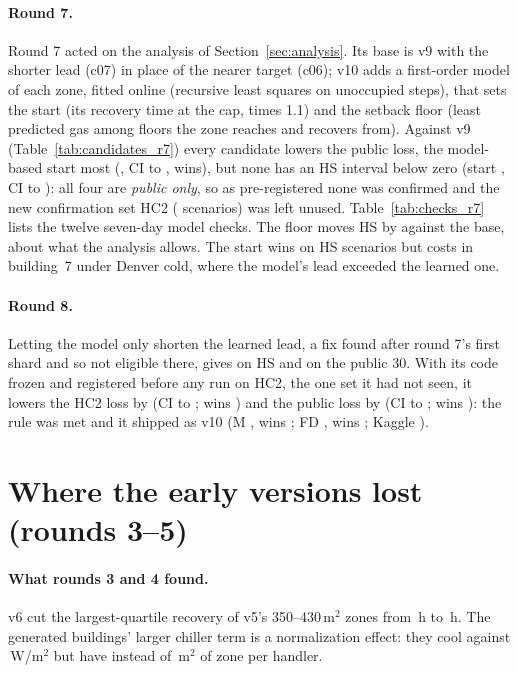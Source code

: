 \documentclass{article}
\begin{document}
\paragraph{Round 7.}
Round 7 acted on the analysis of Section~\ref{sec:analysis}. Its base is v9 with the shorter lead (c07) in place of
the nearer target (c06); v10 adds a first-order model of each zone, fitted online (recursive least squares on unoccupied
steps), that sets the start (its recovery time at the cap, times 1.1) and the setback floor (least predicted gas
among floors the zone reaches and recovers from). Against v9 (Table~\ref{tab:candidates_r7}) every candidate lowers
the public loss, the model-based start most (\RSevScrMbrPubRel, CI \RSevScrMbrPubLo{} to \RSevScrMbrPubHi,
\RSevScrMbrPubWins{} wins), but none has an HS interval below zero (start \RSevScrMbrHsRel, CI \RSevScrMbrHsLo{} to
\RSevScrMbrHsHi): all four are \emph{public only}, so as pre-registered none was confirmed and the new confirmation
set HC2 (\RSevHCTwoN{} scenarios) was left unused. Table~\ref{tab:checks_r7} lists the twelve seven-day model checks. The floor moves HS by \RSevMbfVsBaseHsRel{} against the base,
about what the analysis allows. The start wins on \RSevMbrHsWins{} HS scenarios but costs
\RSevMbrHsWorstRel{} in building~7 under Denver cold, where the model's lead exceeded the learned one.


\paragraph{Round 8.}
Letting the model only shorten the learned lead, a fix found after round 7's first shard and so not eligible there,
gives \RSevLedgerHsRel{} on HS and \RSevLedgerPubRel{} on the public 30. With its code frozen and registered before any
run on HC2, the one set it had not seen, it lowers the HC2 loss by \REigConfHarshCTwoRelAbs{} (CI
\REigConfHarshCTwoRelHiAbs{} to \REigConfHarshCTwoRelLoAbs; wins \REigConfHarshCTwoWins) and the public loss by
\REigConfPubRelAbs{} (CI \REigConfPubRelHiAbs{} to \REigConfPubRelLoAbs; wins \REigConfPubWins): the rule was met
and it shipped as v10 (M \REigConfMinnRel, wins \REigConfMinnWins; FD \REigConfFreshDefRel, wins
\REigConfFreshDefWins; Kaggle \REigKagVTen).

\section{Where the early versions lost (rounds 3--5)}
\label{app:diag}
\paragraph{What rounds 3 and 4 found.}
v6 cut the largest-quartile recovery of v5's 350--430\,m$^2$ zones from \DecHeldRVFiveRecoveryBig\,h to
\DecHeldROursRecoveryBig\,h. The generated buildings' larger chiller term is a normalization effect: they cool
\RFCoolWmRThree{} against \RFCoolWmPub\,W/m$^2$ but have \RFAreaPerAhuRThree{} instead of \RFAreaPerAhuPub\,m$^2$ of zone per handler.
\end{document}
